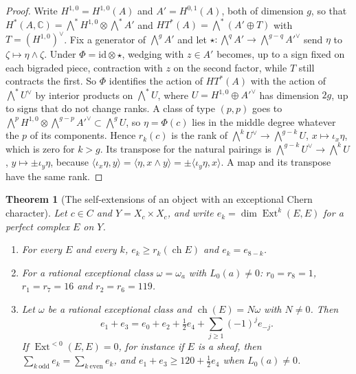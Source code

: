 \documentclass[11pt,reqno]{amsart}
\theoremstyle{plain}
\newtheorem{theorem}{Theorem}[section]
\theoremstyle{definition}
\theoremstyle{remark}
\newcommand{\CC}{\mathbb{C}}
\DeclareMathOperator{\ch}{ch}
\DeclareMathOperator{\Ext}{Ext}
\begin{document}
\begin{proof}
Write $H^{1,0}=H^{1,0}(A)$ and $A'=H^{0,1}(A)$, both of dimension $g$, so
that $H^{*}(A,\CC)=\bigwedge^{*}H^{1,0}\otimes\bigwedge^{*}A'$ and
$HT^{*}(A)=\bigwedge^{*}(A'\oplus T)$ with $T=(H^{1,0})^{\vee}$. Fix a
generator of $\bigwedge^{g}A'$ and let
$\star\colon\bigwedge^{q}A'\to\bigwedge^{g-q}A'^{\vee}$ send $\eta$ to
$\zeta\mapsto\eta\wedge\zeta$. Under $\Phi=\mathrm{id}\otimes\star$, wedging
with $z\in A'$ becomes, up to a sign fixed on each bigraded piece, contraction
with $z$ on the second factor, while $T$ still contracts the first. So $\Phi$
identifies the action of $HT^{*}(A)$ with the action of
$\bigwedge^{*}U^{\vee}$ by interior products on $\bigwedge^{*}U$, where
$U=H^{1,0}\oplus A'^{\vee}$ has dimension $2g$, up to signs that do not change
ranks. A class of type $(p,p)$ goes to
$\bigwedge^{p}H^{1,0}\otimes\bigwedge^{g-p}A'^{\vee}\subset\bigwedge^{g}U$,
so $\eta=\Phi(c)$ lies in the middle degree whatever the $p$ of its
components. Hence $r_{k}(c)$ is the rank of
$\bigwedge^{k}U^{\vee}\to\bigwedge^{g-k}U$, $x\mapsto\iota_{x}\eta$, which is
zero for $k>g$. Its transpose for the natural pairings is
$\bigwedge^{g-k}U^{\vee}\to\bigwedge^{k}U$, $y\mapsto\pm\iota_{y}\eta$,
because $\langle\iota_{x}\eta,y\rangle=\langle\eta,x\wedge y\rangle
=\pm\langle\iota_{y}\eta,x\rangle$. A map and its transpose have the same
rank.
\end{proof}

\begin{theorem}[The self-extensions of an object with an exceptional Chern
character]\label{thm:mumfordprofile}
Let $c\in C$ and $Y=X_{c}\times X_{c}$, and write
$e_{k}=\dim\Ext^{k}(E,E)$ for a perfect complex $E$ on $Y$.
\begin{enumerate}[label=\textup{(\roman*)},leftmargin=2.6em,itemsep=2pt]
\item For every $E$ and every $k$, $e_{k}\ge r_{k}(\ch E)$ and
  $e_{k}=e_{8-k}$.
\item For a rational exceptional class $\omega=\omega_{a}$ with
  $L_{0}(a)\ne0$: $r_{0}=r_{8}=1$, $r_{1}=r_{7}=16$ and $r_{2}=r_{6}=119$.
\item Let $\omega$ be a rational exceptional class and $\ch(E)=N\omega$
  with $N\ne0$. Then
  \[
    e_{1}+e_{3}=e_{0}+e_{2}+\tfrac12e_{4}
      +\sum_{j\ge1}(-1)^{j}e_{-j}.
  \]
  If $\Ext^{<0}(E,E)=0$, for instance if $E$ is a sheaf, then
  $\sum_{k\ \mathrm{odd}}e_{k}=\sum_{k\ \mathrm{even}}e_{k}$, and
  $e_{1}+e_{3}\ge120+\frac12e_{4}$ when $L_{0}(a)\ne0$.
\end{enumerate}
\end{theorem}
\end{document}
